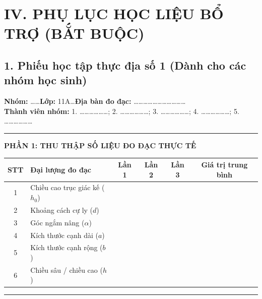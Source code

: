 \documentclass[12pt, a4paper]{article}
\begin{document}
\vspace{10pt}

\section*{IV. PHỤ LỤC HỌC LIỆU BỔ TRỢ (BẮT BUỘC)}

\subsection*{1. Phiếu học tập thực địa số 1 (Dành cho các nhóm học sinh)}

\begin{tcolorbox}[enhanced, colback=white, colframe=blue!70!black, arc=1.5mm, title=\textbf{PHIẾU HỌC TẬP THỰC ĐỊA: ĐO ĐẠC VÀ MÔ HÌNH HÓA HÌNH HỌC KHÔNG GIAN}]
\textbf{Nhóm:} \dots\dots \quad \textbf{Lớp:} 11A\dots \quad \textbf{Địa bàn đo đạc:} \dots\dots\dots\dots\dots\dots\dots\dots\dots\dots\dots\\
\textbf{Thành viên nhóm:} 1. \dots\dots\dots\dots\dots\dots; 2. \dots\dots\dots\dots\dots\dots; 3. \dots\dots\dots\dots\dots\dots; 4. \dots\dots\dots\dots\dots\dots; 5. \dots\dots\dots\dots\dots\dots

\vspace{3pt}
\hrule
\vspace{5pt}

\textbf{\large PHẦN 1: THU THẬP SỐ LIỆU ĐO ĐẠC THỰC TẾ}
\begin{center}
\begin{tabular}{|c|l|c|c|c|c|}
\hline
\textbf{STT} & \textbf{Đại lượng đo đạc} & \textbf{Lần 1} & \textbf{Lần 2} & \textbf{Lần 3} & \textbf{Giá trị trung bình} \\
\hline
1 & Chiều cao trục giác kế ($h_0$) & & & & \\
\hline
2 & Khoảng cách cự ly ($d$) & & & & \\
\hline
3 & Góc ngắm nâng ($\alpha$) & & & & \\
\hline
4 & Kích thước cạnh dài ($a$) & & & & \\
\hline
5 & Kích thước cạnh rộng ($b$) & & & & \\
\hline
6 & Chiều sâu / chiều cao ($h$) & & & & \\
\hline
\end{tabular}
\end{center}

\vspace{5pt}
\hrule
\vspace{5pt}


\end{tcolorbox}
\end{document}
